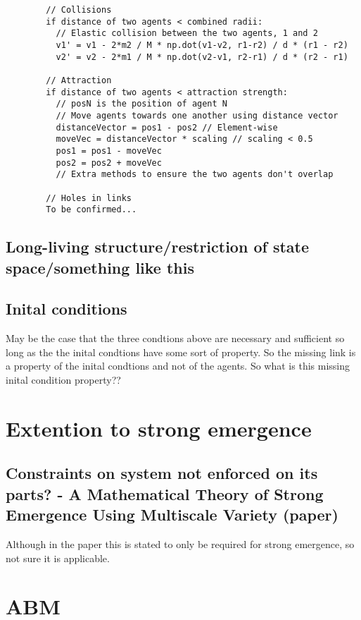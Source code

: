 \documentclass{article}
\begin{document}
      \begin{verbatim}
        // Collisions
        if distance of two agents < combined radii:
          // Elastic collision between the two agents, 1 and 2
          v1' = v1 - 2*m2 / M * np.dot(v1-v2, r1-r2) / d * (r1 - r2) 
          v2' = v2 - 2*m1 / M * np.dot(v2-v1, r2-r1) / d * (r2 - r1)

        // Attraction
        if distance of two agents < attraction strength:
          // posN is the position of agent N
          // Move agents towards one another using distance vector 
          distanceVector = pos1 - pos2 // Element-wise 
          moveVec = distanceVector * scaling // scaling < 0.5
          pos1 = pos1 - moveVec
          pos2 = pos2 + moveVec
          // Extra methods to ensure the two agents don't overlap

        // Holes in links
        To be confirmed...
      \end{verbatim}

  
  \subsection{Long-living structure/restriction of state space/something like this}

  
  \subsection{Inital conditions}
    
    May be the case that the three condtions above are necessary and sufficient so long as the the inital condtions have some sort of property. So the missing link is a property of the inital condtions and not of the agents. So what is this missing inital condition property??


\section{Extention to strong emergence}
  \subsection{Constraints on system not enforced on its parts? - A Mathematical Theory of Strong Emergence Using Multiscale Variety (paper)}
    Although in the paper this is stated to only be required for strong emergence, so not sure it is applicable.


\section{ABM}
\end{document}
